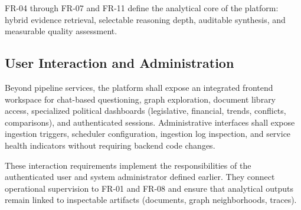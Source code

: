 FR-04 through FR-07 and FR-11 define the analytical core of the platform: hybrid evidence retrieval, selectable reasoning depth, auditable synthesis, and measurable quality assessment.

\subsection{User Interaction and Administration}

Beyond pipeline services, the platform shall expose an integrated frontend workspace for chat-based questioning, graph exploration, document library access, specialized political dashboards (legislative, financial, trends, conflicts, comparisons), and authenticated sessions. Administrative interfaces shall expose ingestion triggers, scheduler configuration, ingestion log inspection, and service health indicators without requiring backend code changes.

These interaction requirements implement the responsibilities of the authenticated user and system administrator defined earlier. They connect operational supervision to FR-01 and FR-08 and ensure that analytical outputs remain linked to inspectable artifacts (documents, graph neighborhoods, traces).

